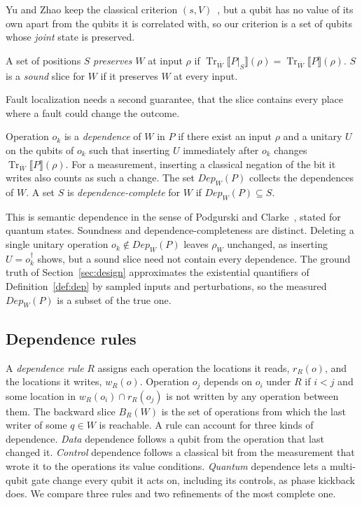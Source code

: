 Yu and Zhao keep the classical criterion $(s, V)$~\cite{yu2025qpdg}, but a qubit has no value of its
own apart from the qubits it is correlated with, so our criterion is a set of qubits whose \emph{joint}
state is preserved.

\begin{definition}\label{def:sound}
A set of positions $S$ \emph{preserves} $W$ at input $\rho$ if
$\operatorname{Tr}_{\overline{W}}\llbracket P|_S \rrbracket(\rho) =
\operatorname{Tr}_{\overline{W}}\llbracket P \rrbracket(\rho)$. $S$ is a \emph{sound} slice for $W$ if
it preserves $W$ at every input.
\end{definition}

Fault localization needs a second guarantee, that the slice contains every place where a fault could
change the outcome.

\begin{definition}\label{def:dep}
Operation $o_k$ is a \emph{dependence} of $W$ in $P$ if there exist an input $\rho$ and a unitary $U$ on
the qubits of $o_k$ such that inserting $U$ immediately after $o_k$ changes
$\operatorname{Tr}_{\overline{W}}\llbracket P \rrbracket(\rho)$. For a measurement, inserting a classical
negation of the bit it writes also counts as such a change.
The set $\mathit{Dep}_W(P)$ collects the dependences of $W$. A set $S$ is \emph{dependence-complete} for $W$ if
$\mathit{Dep}_W(P) \subseteq S$.
\end{definition}

This is semantic dependence in the sense of Podgurski and Clarke~\cite{podgurski1990formal}, stated for
quantum states. Soundness and dependence-completeness are distinct. Deleting a single unitary operation
$o_k \notin \mathit{Dep}_W(P)$ leaves $\rho_W$ unchanged, as inserting $U = o_k^{\dagger}$ shows, but a sound
slice need not contain every dependence. The ground truth of Section~\ref{sec:design} approximates the
existential quantifiers of Definition~\ref{def:dep} by sampled inputs and perturbations, so the measured
$\mathit{Dep}_W(P)$ is a subset of the true one.

\subsection{Dependence rules}

A \emph{dependence rule} $R$ assigns each operation the locations it reads, $r_R(o)$, and the
locations it writes, $w_R(o)$. Operation $o_j$ depends on $o_i$ under $R$ if $i < j$ and some location
in $w_R(o_i) \cap r_R(o_j)$ is not written by any operation between them. The backward slice
$B_R(W)$ is the set of operations from which the last writer of some $q \in W$ is reachable. A rule can
account for three kinds of dependence. \emph{Data} dependence follows a qubit from the operation that
last changed it. \emph{Control} dependence follows a classical bit from the measurement that wrote it to
the operations its value conditions. \emph{Quantum} dependence lets a multi-qubit gate change every qubit
it acts on, including its controls, as phase kickback does. We compare three rules and two refinements of the most complete one.

